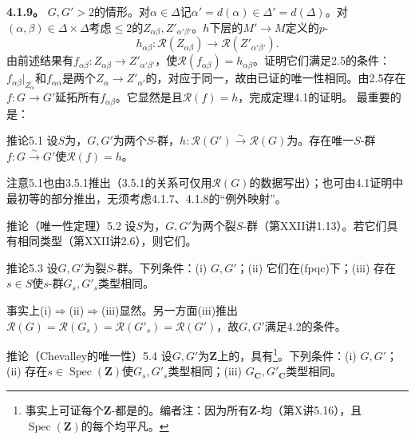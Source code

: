 \textbf{4.1.9。} $G,G'$$>2$的情形。对$\alpha\in\Delta$记$\alpha'=d(\alpha)\in\Delta'=d(\Delta)$。对$(\alpha,\beta)\in\Delta\times\Delta$考虑$\leq2$的$Z_{\alpha\beta},Z'_{\alpha'\beta'}$。$h$下层的$M'\to M$定义的$p$-
\[h_{\alpha\beta}:\mathcal R(Z_{\alpha\beta})\longrightarrow\mathcal R(Z'_{\alpha'\beta'}).\]
由前述结果有$f_{\alpha\beta}:Z_{\alpha\beta}\to Z'_{\alpha'\beta'}$，使$\mathcal R(f_{\alpha\beta})=h_{\alpha\beta}$。证明它们满足2.5的条件：$f_{\alpha\beta}|_{Z_\alpha}$和$f_{\alpha\alpha}$是两个$Z_\alpha\to Z'_{\alpha'}$的，对应于同一，故由已证的唯一性相同。由2.5存在$f:G\to G'$延拓所有$f_{\alpha\beta}$。它显然是且$\mathcal R(f)=h$，完成定理4.1的证明。
最重要的是：
\begin{SGAresult}{推论}{5.1}
设$S$为，$G,G'$为两个$S$-群，$h:\mathcal R(G')\xrightarrow\sim\mathcal R(G)$为。存在唯一$S$-群$f:G\xrightarrow\sim G'$使$\mathcal R(f)=h$。
\end{SGAresult}
注意5.1也由3.5.1推出（3.5.1的关系可仅用$\mathcal R(G)$的数据写出）；也可由4.1证明中最初等的部分推出，无须考虑4.1.7、4.1.8的“例外映射”。
\begin{SGAresult}{推论（唯一性定理）}{5.2}
设$S$为，$G,G'$为两个裂$S$-群（第XXII讲1.13）。若它们具有相同类型（第XXII讲2.6），则它们。
\end{SGAresult}
\begin{SGAresult}{推论}{5.3}
设$G,G'$为裂$S$-群。下列条件：(i) $G,G'$；(ii) 它们在(fpqc)下；(iii) 存在$s\in S$使$s$-群$G_s,G'_s$类型相同。
\end{SGAresult}
事实上(i)$\Rightarrow$(ii)$\Rightarrow$(iii)显然。另一方面(iii)推出$\mathcal R(G)=\mathcal R(G_s)=\mathcal R(G'_s)=\mathcal R(G')$，故$G,G'$满足4.2的条件。
\begin{SGAresult}{推论（Chevalley的唯一性）}{5.4}
设$G,G'$为$\mathbf Z$上的，具有\footnote{事实上可证每个$\mathbf Z$-都是的。编者注：因为所有$\mathbf Z$-均（第X讲5.16），且$\operatorname{Spec}(\mathbf Z)$的每个均平凡。}。下列条件：(i) $G,G'$；(ii) 存在$s\in\operatorname{Spec}(\mathbf Z)$使$G_s,G'_s$类型相同；(iii) $G_{\mathbf C},G'_{\mathbf C}$类型相同。
\end{SGAresult}
